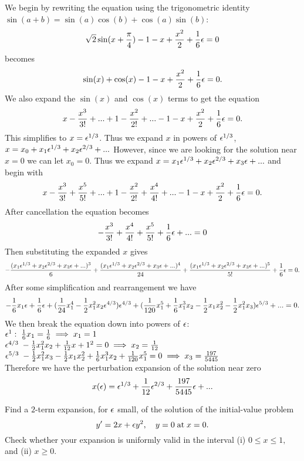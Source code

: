             \item We begin by rewriting the equation using the trigonometric identity $\sin(a+b)=\sin(a)\cos(b)+\cos(a)\sin(b)$:
                $$\sqrt{2}\sin(x+\frac{\pi}{4})-1-x+\frac{x^2}{2}+\frac{1}{6}\epsilon=0$$
                becomes
                $$\sin(x)+\cos(x)-1-x+\frac{x^2}{2}+\frac{1}{6}\epsilon=0.$$
                We also expand the $\sin(x)$ and $\cos(x)$ terms to get the equation
                $$x-\frac{x^3}{3!}+...+1-\frac{x^2}{2!}+...-1-x+\frac{x^2}{2}+\frac{1}{6}\epsilon=0.$$
                This simplifies to $x=\epsilon^{1/3}$. Thus we expand $x$ in powers of $\epsilon^{1/3}$, $x=x_0+x_1\epsilon^{1/3}+x_2\epsilon^{2/3}+...$ However, since we are looking for the solution near $x=0$ we can let $x_0=0$. Thus we expand $x=x_1\epsilon^{1/3}+x_2\epsilon^{2/3}+x_3\epsilon+...$ and begin with
                $$x-\frac{x^3}{3!}+\frac{x^5}{5!}+...+1-\frac{x^2}{2!}+\frac{x^4}{4!}+...-1-x+\frac{x^2}{2}+\frac{1}{6}\epsilon=0.$$
                After cancellation the equation becomes
                $$-\frac{x^3}{3!}+\frac{x^4}{4!}+\frac{x^5}{5!}+\frac{1}{6}\epsilon+...=0$$
                Then substituting the expanded $x$ gives
                $$-\frac{(x_1\epsilon^{1/3}+x_2\epsilon^{2/3}+x_3\epsilon+...)^3}{6}+\frac{(x_1\epsilon^{1/3}+x_2\epsilon^{2/3}+x_3\epsilon+...)^4}{24}+\frac{(x_1\epsilon^{1/3}+x_2\epsilon^{2/3}+x_3\epsilon+...)^5}{5!}+\frac{1}{6}\epsilon=0.$$
                After some simplification and rearrangement we have
                $$-\frac{1}{6}x_1\epsilon+\frac{1}{6}\epsilon+(\frac{1}{24}x_1^4-\frac{1}{2}x_1^2x_2\epsilon^{4/3})\epsilon^{4/3}+(\frac{1}{120}x_1^5+\frac{1}{6}x_1^3x_2-\frac{1}{2}x_1x_2^2-\frac{1}{2}x_1^2x_3)\epsilon^{5/3}+...=0.$$
                We then break the equation down into powers of $\epsilon$:\\
                $\epsilon^1: \; \frac{1}{6}x_1=\frac{1}{6}\implies x_1=1$\\
                $\epsilon^{4/3}\; -\frac{1}{2}x_1^2x_2+\frac{1}{12}x+1^2=0\implies x_2=\frac{1}{12}$\\
                $\epsilon^{5/3}\; -\frac{1}{2}x_1^2x_3-\frac{1}{2}x_1x_2^2+\frac{1}{6}x_1^3x_2+\frac{1}{120}x_1^5=0\implies x_3=\frac{197}{5445}$\\
                Therefore we have the perturbation expansion of the solution near zero
                $$x(\epsilon)=\epsilon^{1/3}+\frac{1}{12}\epsilon^{2/3}+\frac{197}{5445}\epsilon+...$$


        \eenum



 \item Find a $2$-term expansion, for $\epsilon$ small, of the solution of the initial-value problem
 \begin{equation*}
y'=2x+\epsilon y^2, \quad y=0 \; \text{at}\; x=0.
\end{equation*}
Check whether your expansion is uniformly valid in the interval (i) $0 \le x \le 1,$ and (ii)  $x \ge 0.$\\

